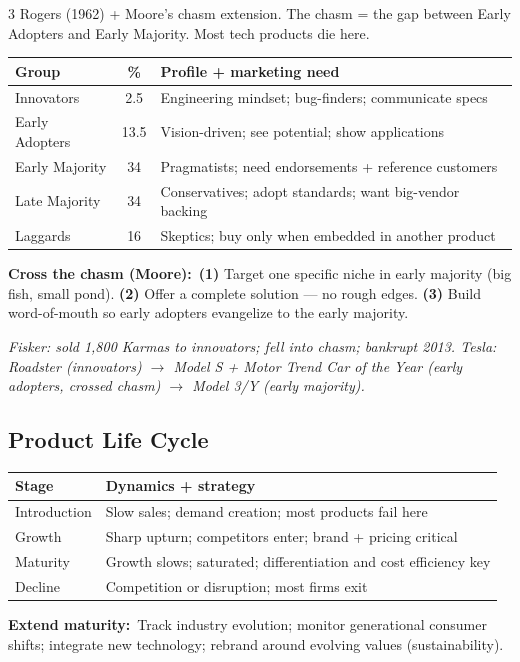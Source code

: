 \documentclass[7.6pt,letterpaper]{article}
\newcommand{\T}[1]{\textbf{\color{navy}#1}}
\newcommand{\kk}[2]{\noindent\T{#1}\ #2\par}
\newcommand{\eg}[1]{\textit{\color{mid}#1}}
\newcommand{\sh}{\rowcolor{strip}}
\newcommand{\ctab}[1]{{\fontsize{6.2pt}{7pt}\selectfont\setlength{\tabcolsep}{2.5pt}#1}}
\begin{document}
\begin{multicols}{3}
Rogers (1962) + Moore's chasm extension. The chasm = the gap between Early Adopters and Early Majority. Most tech products die here.

\ctab{\begin{tabular}{@{}p{1.6cm}cp{3.8cm}@{}}
\toprule
\sh \T{Group} & \T{\%} & \T{Profile + marketing need} \\
\midrule
Innovators & 2.5 & Engineering mindset; bug-finders; communicate specs \\
Early Adopters & 13.5 & Vision-driven; see potential; show applications \\
Early Majority & 34 & Pragmatists; need endorsements + reference customers \\
Late Majority & 34 & Conservatives; adopt standards; want big-vendor backing \\
Laggards & 16 & Skeptics; buy only when embedded in another product \\
\bottomrule
\end{tabular}}

\kk{Cross the chasm (Moore):}{\T{(1)} Target one specific niche in early majority (big fish, small pond). \T{(2)} Offer a complete solution --- no rough edges. \T{(3)} Build word-of-mouth so early adopters evangelize to the early majority.}

\eg{Fisker: sold 1,800 Karmas to innovators; fell into chasm; bankrupt 2013. Tesla: Roadster (innovators) $\to$ Model S + Motor Trend Car of the Year (early adopters, crossed chasm) $\to$ Model 3/Y (early majority).}

\subsection{Product Life Cycle}

\ctab{\begin{tabular}{@{}p{1.5cm}p{4.1cm}@{}}
\toprule
\sh \T{Stage} & \T{Dynamics + strategy} \\
\midrule
Introduction & Slow sales; demand creation; most products fail here \\
Growth & Sharp upturn; competitors enter; brand + pricing critical \\
Maturity & Growth slows; saturated; differentiation and cost efficiency key \\
Decline & Competition or disruption; most firms exit \\
\bottomrule
\end{tabular}}

\kk{Extend maturity:}{Track industry evolution; monitor generational consumer shifts; integrate new technology; rebrand around evolving values (sustainability).}


\end{multicols}
\end{document}
